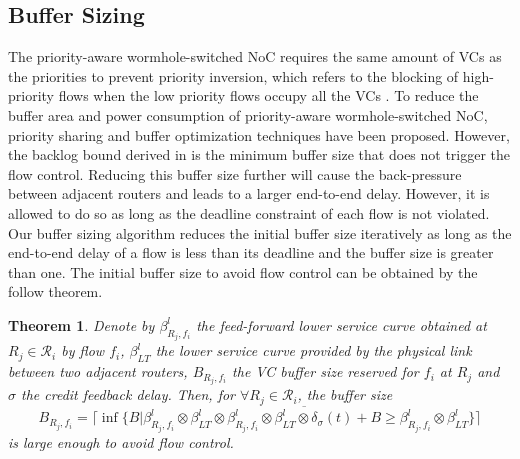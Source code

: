 \documentclass[preprint]{elsarticle}
\newtheorem{thm}{Theorem}
\begin{document}
\subsection{Buffer Sizing}\label{bufferopt}
The priority-aware wormhole-switched NoC \cite{Shi:2008:RCA:1397757.1397996,708526,627905} requires the same amount of VCs as the priorities to prevent priority inversion, which refers to the blocking of high-priority flows when the low priority flows occupy all the VCs \cite{707545}. To reduce the buffer area and power consumption of priority-aware wormhole-switched NoC, priority sharing \cite{5161497} and buffer optimization \cite{189} techniques have been proposed. However, the backlog bound derived in \cite{189} is the minimum buffer size that does not trigger the flow control. Reducing this buffer size further will cause the back-pressure between adjacent routers and leads to a larger end-to-end delay. However, it is allowed to do so as long as the deadline constraint of each flow is not violated. Our buffer sizing algorithm reduces the initial buffer size iteratively as long as the end-to-end delay of a flow is less than its deadline and the buffer size is greater than one. The initial buffer size to avoid flow control can be obtained by the follow theorem.
\begin{thm}\label{initial}
Denote by $\beta_{R_j,f_i}^l$ the feed-forward lower service curve obtained at $R_j\in\mathcal{R}_i$ by flow $f_i$, $\beta_{LT}^l$ the lower service curve provided by the physical link between two adjacent routers, $B_{R_j,f_i}$ the VC buffer size reserved for $f_i$ at $R_j$ and $\sigma$ the credit feedback delay. Then, for $\forall R_j\in\mathcal{R}_i$, the buffer size $$B_{R_j,f_i}=\lceil\inf\{B|\beta_{R_j,f_i}^l\otimes\beta_{LT}^l\otimes\overline{\beta_{R_j,f_i}^l\otimes\beta_{LT}^l\otimes\delta_\sigma(t)+B}\geq\beta_{R_j,f_i}^l\otimes\beta_{LT}^l\}\rceil$$
is large enough to avoid flow control.
\end{thm}
\end{document}
